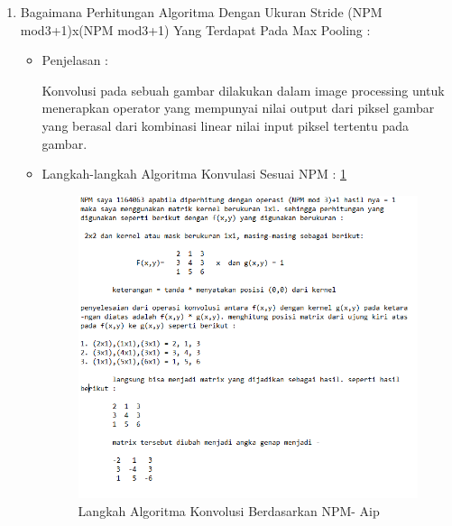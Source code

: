 \begin{enumerate}
\item Bagaimana Perhitungan Algoritma Dengan Ukuran Stride (NPM mod3+1)x(NPM mod3+1) Yang  Terdapat Pada Max Pooling :
\begin{itemize}
\item Penjelasan :
\par Konvolusi pada sebuah gambar dilakukan dalam image processing untuk menerapkan operator yang mempunyai nilai output dari piksel gambar yang berasal dari kombinasi linear nilai input piksel tertentu pada gambar.
\par
\item Langkah-langkah Algoritma Konvulasi Sesuai NPM : \ref{chapter-7-algoritma-konvolusi-Aip}
\par
\par
\begin{figure}[!hbtp]
\centering
\includegraphics[scale=0.52]{figures/AIP/g13.PNG}
\caption{Langkah Algoritma Konvolusi Berdasarkan NPM- Aip}
\label{chapter-7-algoritma-konvolusi-Aip}
\end{figure}
\par
\par
\end{itemize}
\end{enumerate}

